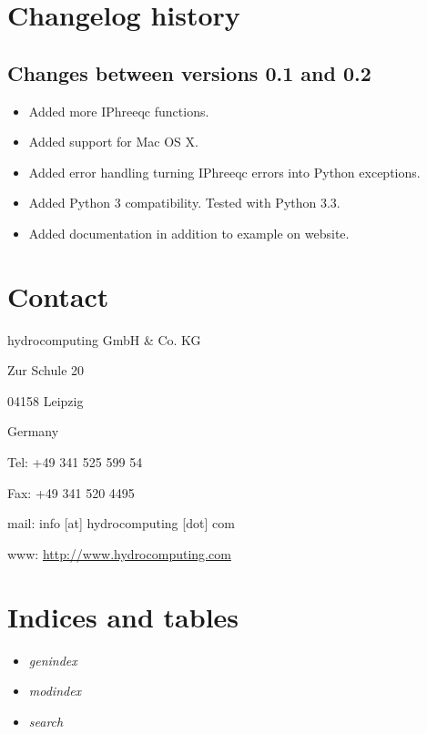 \documentclass[letterpaper,10pt,english]{sphinxmanual}
\begin{document}
\chapter{Changelog history}
\label{changelog:changelog-history}\label{changelog::doc}\label{changelog:changelog}

\section{Changes between versions 0.1 and 0.2}
\label{changelog:changes-between-versions-0-1-and-0-2}\begin{itemize}
\item {} 
Added more IPhreeqc functions.

\item {} 
Added support for Mac OS X.

\item {} 
Added error handling turning IPhreeqc errors into Python exceptions.

\item {} 
Added Python 3 compatibility. Tested with Python 3.3.

\item {} 
Added documentation in addition to example on website.

\end{itemize}


\chapter{Contact}
\label{contact:contact}\label{contact::doc}
\begin{DUlineblock}{0em}
\item[] hydrocomputing GmbH \& Co. KG
\item[] Zur Schule 20
\item[] 04158 Leipzig
\item[] Germany
\end{DUlineblock}

\begin{DUlineblock}{0em}
\item[] Tel: +49 341 525 599 54
\item[] Fax: +49 341 520 4495
\item[] mail: info {[}at{]} hydrocomputing {[}dot{]} com
\item[] www: \href{http://www.hydrocomputing.com}{http://www.hydrocomputing.com}
\end{DUlineblock}


\chapter{Indices and tables}
\label{contents:indices-and-tables}\begin{itemize}
\item {} 
\emph{genindex}

\item {} 
\emph{modindex}

\item {} 
\emph{search}

\end{itemize}
\end{document}
